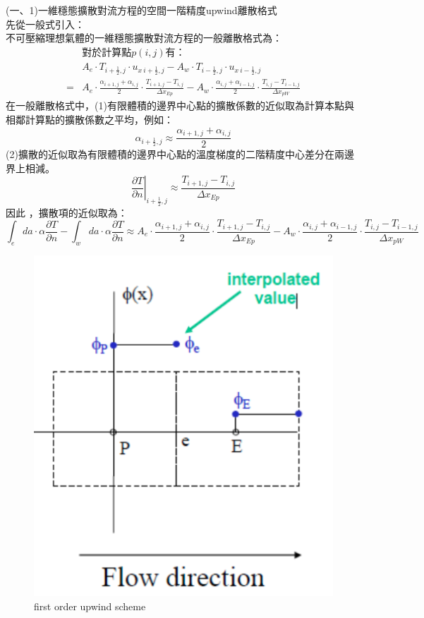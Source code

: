 \documentclass[12pt]{article}
\begin{document}
\noindent (一、1)一維穩態擴散對流方程的空間一階精度upwind離散格式\\
\noindent 先從一般式引入：\\
\noindent 不可壓縮理想氣體的一維穩態擴散對流方程的一般離散格式為：
\begin{equation}
    \begin{split}
        &\mbox{對於計算點}p(i,j)\mbox{有：}\\
        &A_{e}\cdot T_{i+\frac{1}{2},j}\cdot u_{x\ i+\frac{1}{2},j}  -A_{w}\cdot T_{i-\frac{1}{2},j}\cdot u_{x\ i-\frac{1}{2},j} \\
        =&A_{e}\cdot \frac{\alpha_{i+1,j}+\alpha_{i,j}}{2}\cdot \frac{T_{i+1,j} - T_{i,j}}{\Delta x_{Ep}} - A_{w}\cdot \frac{\alpha_{i,j}+\alpha_{i-1,j}}{2}\cdot \frac{T_{i,j} - T_{i-1,j}}{\Delta x_{pW}}
    \end{split}
\end{equation}
\noindent 在一般離散格式中，(1)有限體積的邊界中心點的擴散係數的近似取為計算本點與相鄰計算點的擴散係數之平均，例如：
$$\alpha_{i+\frac{1}{2},j} \approx \frac{\alpha_{i+1,j} + \alpha_{i,j}}{2}$$
\noindent (2)擴散的近似取為有限體積的邊界中心點的溫度梯度的二階精度中心差分在兩邊界上相減。\\
$$\left.\frac{\partial T}{\partial n}\right|_{i+\frac{1}{2},j} \approx \frac{T_{i+1,j} - T_{i,j}}{\Delta x_{Ep}}$$
\noindent 因此 ，擴散項的近似取為：\\
$$\int_{e}da \cdot \alpha \frac{\partial T}{\partial n} - \int_{w}da \cdot \alpha\frac{\partial T}{\partial n} \approx A_{e} \cdot \frac{\alpha_{i+1,j} +\alpha_{i,j}}{2} \cdot \frac{T_{i+1,j} - T_{i,j}}{\Delta x_{Ep}} - A_{w}\cdot \frac{\alpha_{i,j}+\alpha_{i-1,j}}{2} \cdot \frac{T_{i,j} - T_{i-1,j}}{\Delta x_{pW}} $$
\begin{figure}[H]
  \centering
  \includegraphics[scale = 0.56]{7.png}
  \caption{first order upwind scheme }
  \label{fig:1st upwind scheme }
\end{figure}
\end{document}
